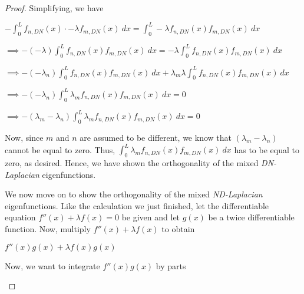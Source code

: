 \documentclass[executivepaper]{article}
\begin{document}
\begin{flushleft}
\begin{proof}
Simplifying, we have

\begin{center}

$-\int_{0}^{L} f_{n, DN}(x) \cdot -\lambda f_{m, DN}(x) \ dx=\int_{0}^{L} -\lambda f_{n, DN}(x)f_{m, DN}(x) \ dx$

\vspace{2mm}

$\implies -(-\lambda) \int_{0}^{L} f_{n, DN}(x)f_{m, DN}(x) \ dx=-\lambda \int_{0}^{L} f_{n, DN}(x)f_{m, DN}(x) \ dx$

\vspace{2mm}

$\implies -(-\lambda_{n}) \int_{0}^{L} f_{n, DN}(x)f_{m, DN}(x) \ dx + \lambda_{m} \lambda \int_{0}^{L} f_{n, DN}(x)f_{m, DN}(x) \ dx$

\vspace{2mm}

$\implies -(-\lambda_{n}) \int_{0}^{L} \lambda_{m} f_{n, DN}(x)f_{m, DN}(x) \ dx=0$

\vspace{2mm}

$\implies -(\lambda_{m}-\lambda_{n}) \int_{0}^{L} \lambda_{m} f_{n, DN}(x)f_{m, DN}(x) \ dx=0$

\end{center}

Now, since $m$ and $n$ are assumed to be different, we know that $(\lambda_{m}-\lambda_{n})$ cannot be equal to zero. Thus, $\int_{0}^{L} \lambda_{m} f_{n, DN}(x)f_{m, DN}(x) \ dx$ has to be equal to zero, as desired.
Hence, we have shown the orthogonality of the mixed \textit{DN-Laplacian} eigenfunctions.

\vspace{5mm}

We now move on to show the orthogonality of the mixed \textit{ND-Laplacian} eigenfunctions. Like the calculation we just finished, let the differentiable equation $f''(x)+\lambda f(x)=0$ be given and let $g(x)$ be a twice differentiable function. Now, multiply $f''(x)+\lambda f(x)$ to obtain

\begin{center}

$f''(x)g(x)+\lambda f(x)g(x)$

\end{center}

Now, we want to integrate $f''(x)g(x)$ by parts

\begin{center}


\end{center}
\end{proof}
\end{flushleft}
\end{document}
